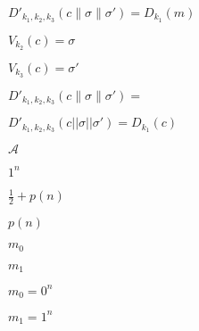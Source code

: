 \documentclass[10pt]{book}
\begin{document}
\begin{mdSnippets}
\begin{mdInlineSnippet}[5f3759e058e65d2a01427d967a1021ad]
$D'_{k_1,k_2,k_3}(c\|\sigma\|\sigma')=D_{k_1}(m)$\end{mdInlineSnippet}%
\begin{mdInlineSnippet}%
$V_{k_2}(c)=\sigma$\end{mdInlineSnippet}%
\begin{mdInlineSnippet}[73c9ec4c45c3942c02cf50d63e28eeb8]%
$V_{k_3}(c)=\sigma'$\end{mdInlineSnippet}%
\begin{mdInlineSnippet}[8f7f844c9b084b0e07dbca89f181868a]%
$D'_{k_1,k_2,k_3}(c\|\sigma\|\sigma')=$\end{mdInlineSnippet}%
\begin{mdInlineSnippet}[d5a91a394ac288c2614dec32a75857d4]%
$D'_{k_1,k_2,k_3}(c || \sigma || \sigma') = D_{k_1}(c)$\end{mdInlineSnippet}%
\begin{mdInlineSnippet}[ad70146b431bea9ae74cf8385470c544]%
$\mathcal{A}$\end{mdInlineSnippet}%
\begin{mdInlineSnippet}%
$1^n$\end{mdInlineSnippet}%
\begin{mdInlineSnippet}[64f5991003da134cc68fa343d048ebac]%
$\frac{1}{2} + p(n)$\end{mdInlineSnippet}%
\begin{mdInlineSnippet}%
$p(n)$\end{mdInlineSnippet}%
\begin{mdInlineSnippet}[fed1e4775925bd3f7af0c5d8fc47e4e6]%
$m_0$\end{mdInlineSnippet}%
\begin{mdInlineSnippet}%
$m_1$\end{mdInlineSnippet}%
\begin{mdInlineSnippet}[185b3f7b453a8153334176c86e181bda]%
$m_0 = 0^n$\end{mdInlineSnippet}%
\begin{mdInlineSnippet}[167f7197211e2ff40ae15b434b04fe9e]%
$m_1 = 1^n$\end{mdInlineSnippet}%

\end{mdSnippets}
\end{document}
